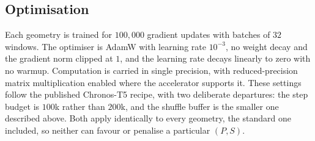 \subsection{Optimisation}

Each geometry is trained for $100{,}000$ gradient updates with batches of $32$ windows. The optimiser is AdamW with learning rate $10^{-3}$, no weight decay and the gradient norm clipped at $1$, and the learning rate decays linearly to zero with no warmup. Computation is carried in single precision, with reduced-precision matrix multiplication enabled where the accelerator supports it. These settings follow the published Chronos-T5 recipe, with two deliberate departures: the step budget is $100$k rather than $200$k, and the shuffle buffer is the smaller one described above. Both apply identically to every geometry, the standard one included, so neither can favour or penalise a particular $(P,S)$.
